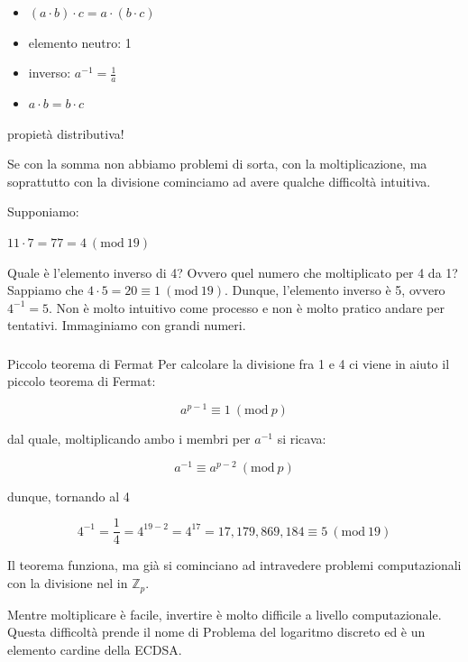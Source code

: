 \documentclass{book}
\theoremstyle{definition}
\newcommand{\Mod}[1]{\ (\mathrm{mod}\ #1)}
\newcommand{\Zp}{\mathbb{Z}_{p}}
\begin{document}
\begin{itemize}
    \item $(a \cdot b) \cdot c = a \cdot (b \cdot c)$
    \item elemento neutro: 1
    \item inverso: $a^{-1} = \frac{1}{a}$
    \item $a \cdot b = b \cdot c$
\end{itemize}

propietà distributiva!

Se con la somma non abbiamo problemi di sorta, con la moltiplicazione, ma soprattutto con la divisione cominciamo ad avere qualche difficoltà intuitiva.

Supponiamo:

$11 \cdot 7 = 77 = 4 \Mod{19}$

Quale è l’elemento inverso di 4? Ovvero quel numero che moltiplicato per 4 da 1? 
Sappiamo che $4 \cdot 5 = 20 \equiv 1 \Mod{19}$. 
Dunque, l’elemento inverso è 5, ovvero $4^{-1} = 5$. 
Non è molto intuitivo come processo e non è molto pratico andare per tentativi. Immaginiamo con grandi numeri.

\subsubsection{}{Piccolo teorema di Fermat}
Per calcolare la divisione fra 1 e 4 ci viene in aiuto il piccolo teorema di Fermat:

\begin{equation}
    a^{p-1} \equiv 1 \Mod{p} \label{piccolo_teorema_di_fermat}
\end{equation}

dal quale, moltiplicando ambo i membri per $a^{-1}$ si ricava:

\begin{equation}
    a^{-1} \equiv a^{p-2} \Mod{p} \label{piccolo_teorema_di_fermat}
\end{equation}

dunque, tornando al 4

$$
4^{-1} = \frac{1}{4} = 4^{19-2} = 4^{17} = 17,179,869,184 \equiv 5 \Mod{19}
$$

Il teorema funziona, ma già si cominciano ad intravedere problemi computazionali con la divisione nel in $\Zp$.

Mentre moltiplicare è facile, invertire è molto difficile a livello computazionale. 
Questa difficoltà prende il nome di Problema del logaritmo discreto ed è un elemento cardine della ECDSA.
\end{document}
